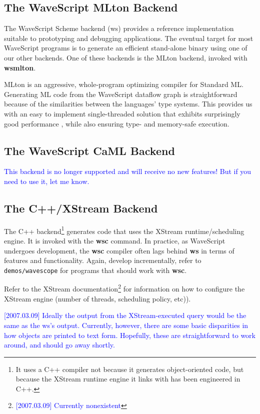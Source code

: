 \documentclass[twocolumn]{report}
\newcommand{\rednote}[1]{{\textcolor{blue}{#1}}}
\newcommand{\ws}{WaveScript}
\begin{document}
\subsection{The WaveScript MLton Backend}

The WaveScript Scheme backend (ws) provides a reference implementation suitable
to prototyping and debugging applications.  The eventual target for
most WaveScript programs is to generate an efficient stand-alone
binary using one of our other backends.  One of these backends is the
MLton backend, invoked with {\bf wsmlton}.

MLton is an aggressive, whole-program optimizing compiler for Standard
ML.  Generating ML code from the {\ws} dataflow graph is
straightforward because of the similarities between the languages'
type systems.  This provides us with an easy to implement
single-threaded solution that exhibits surprisingly good performance
\cite{mlton}, while also ensuring type- and memory-safe
execution.  

\subsection{The WaveScript CaML Backend}

\rednote{This backend is no longer supported and will receive no new
  features!  But if you need to use it, let me know.}

\subsection{The C++/XStream Backend}
The C++ backend\footnote{It uses a C++ compiler not because it
  generates object-oriented code, but because the XStream runtime engine it
  links with has been engineered in C++.} generates code that uses the
XStream runtime/scheduling engine.  It is invoked with the {\bf wsc}
command.  
In practice, as WaveScript undergoes development, the {\bf wsc}
compiler often lags behind {\bf ws} in terms of features and
functionality.  Again, develop incrementally, refer to {\tt
  demos/wavescope} for programs that should work with {\bf
  wsc}.

Refer to the XStream documentation\footnote{\rednote{[2007.03.09] Currently nonexistent}} 
for information on how to configure the XStream engine
(number of threads, scheduling policy, etc)).

\rednote{[2007.03.09] Ideally the output from the XStream-executed
query would be the same as the ws's output.  Currently, however, there are
some basic disparities in how objects are printed to text form.  Hopefully, these
are straightforward to work around, and should go away shortly.}
\end{document}
